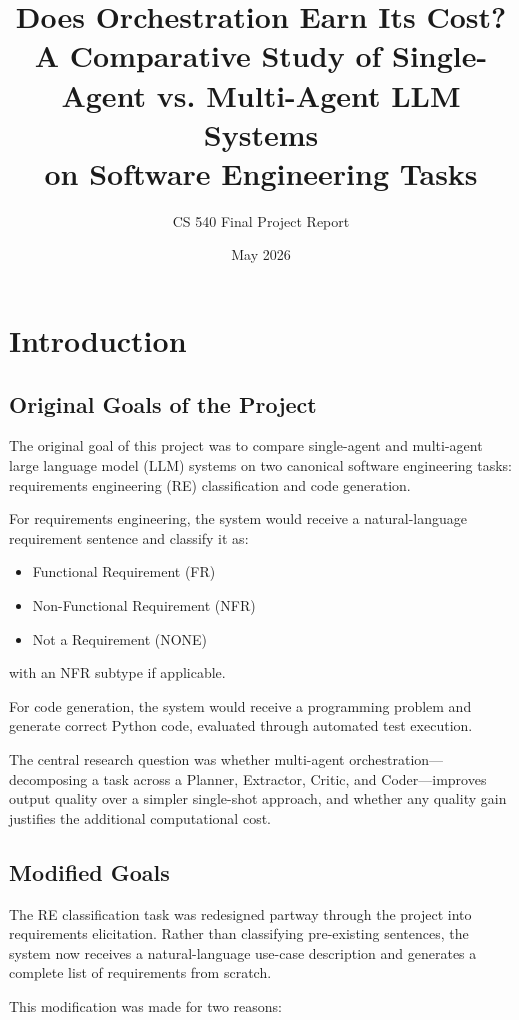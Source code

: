 \documentclass[11pt]{article}
\title{Does Orchestration Earn Its Cost?\\
A Comparative Study of Single-Agent vs. Multi-Agent LLM Systems\\
on Software Engineering Tasks}
\author{CS 540 Final Project Report\\
[Team Member Names]}
\date{May 2026}
\begin{document}
\maketitle
\tableofcontents
\newpage

\section{Introduction}

\subsection{Original Goals of the Project}

The original goal of this project was to compare single-agent and multi-agent large language model (LLM) systems on two canonical software engineering tasks: requirements engineering (RE) classification and code generation.

For requirements engineering, the system would receive a natural-language requirement sentence and classify it as:
\begin{itemize}
    \item Functional Requirement (FR)
    \item Non-Functional Requirement (NFR)
    \item Not a Requirement (NONE)
\end{itemize}

with an NFR subtype if applicable.

For code generation, the system would receive a programming problem and generate correct Python code, evaluated through automated test execution.

The central research question was whether multi-agent orchestration---decomposing a task across a Planner, Extractor, Critic, and Coder---improves output quality over a simpler single-shot approach, and whether any quality gain justifies the additional computational cost.

\subsection{Modified Goals}

The RE classification task was redesigned partway through the project into requirements elicitation. Rather than classifying pre-existing sentences, the system now receives a natural-language use-case description and generates a complete list of requirements from scratch.

This modification was made for two reasons:
\end{document}

